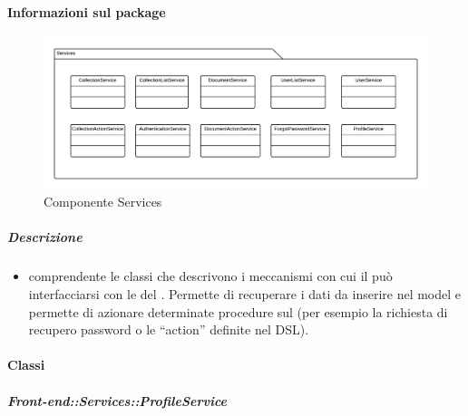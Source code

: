   \paragraph{Informazioni sul package}
    \begin{figure}[H] 
      \begin{center} 
        \includegraphics[width=\textwidth]{uml/package/Front-end::Services.png}  
        \caption{Componente Services}
      \end{center}  
    \end{figure} 
  \subparagraph{Descrizione} 
    \begin{itemize}
    \item[]  comprendente le classi che descrivono i meccanismi con cui il  può interfacciarsi con le  del . Permette di recuperare i dati da inserire nel model e permette di azionare determinate procedure sul  (per esempio la richiesta di recupero password o le ``action'' definite nel DSL).
    \end{itemize} 
    \paragraph{Classi}
      \subparagraph{Front-end::Services::ProfileService}
        

